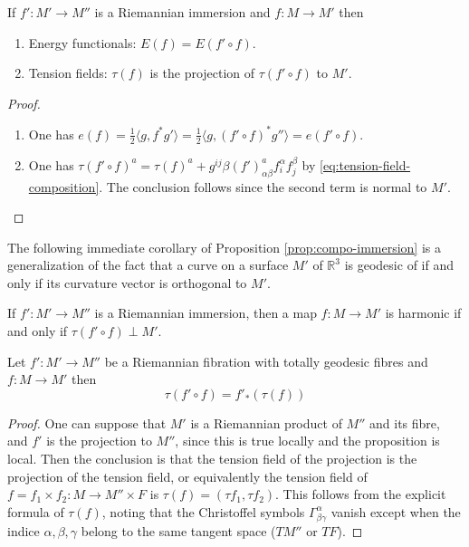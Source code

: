 \begin{proposition}
\label{prop:compo-immersion}
If \(f': M' \longrightarrow M''\) is a Riemannian immersion and \(f: M \longrightarrow
M'\) then 
\begin{enumerate}
\item Energy functionals: \(E(f) = E(f'\circ f)\).
\item Tension fields: \(\tau(f)\) is the projection of \(\tau(f'\circ f)\) to \(M'\).
\end{enumerate}
\end{proposition}
\begin{proof}
\begin{enumerate}
\item One has \(e(f) = \frac{1}{2}\langle g, f^* g' \rangle  = \frac{1}{2}\langle g,
   (f'\circ f)^* g'' \rangle = e(f'\circ f)\).
\item One has \(\tau(f'\circ f)^a  = \tau(f)^a +
   g^{ij}\beta(f')^a_{\alpha\beta} f^\alpha_i f^\beta_j\) by
\eqref{eq:tension-field-composition}. The conclusion follows since the second term is normal to \(M'\).
\end{enumerate}
\end{proof}

The following immediate corollary of Proposition \ref{prop:compo-immersion} is a
generalization of the fact that a curve on a surface \(M'\) of \(\mathbb{R}^3\) is geodesic of if and only if its curvature vector is
orthogonal to \(M'\).

\begin{corollary}
If \(f': M' \longrightarrow M''\) is a Riemannian immersion, then a map \(f: M \longrightarrow M'\) is harmonic if and only if \(\tau(f'\circ f) \perp M'\).
\end{corollary}


\iffalse


\begin{proposition}
\label{prop:compo-submersion}
Let \(f': M' \longrightarrow M''\) be a Riemannian fibration with totally geodesic
fibres and \(f: M \longrightarrow M'\) then 
\[
\tau(f'\circ f) = f'_*(\tau(f))  
\]
\end{proposition}

\begin{proof}
One can suppose that \(M'\) is a Riemannian product of \(M''\) and its fibre, and
\(f'\) is the projection to \(M''\), since this is true locally and the proposition is
local. Then the conclusion is that the tension field of the projection is the projection
of the tension field, or equivalently the tension field of \(f= f_1\times f_2: M \longrightarrow
M''\times F\) is \(\tau(f) = (\tau f_1,\tau f_2)\). This follows from the explicit
formula of \(\tau(f)\), noting that the Christoffel symbols \(\Gamma^\alpha_{\beta\gamma}\) vanish except when the indice \(\alpha,\beta,\gamma\)
belong to the same tangent space (\(TM''\) or \(TF\)).
\end{proof}

